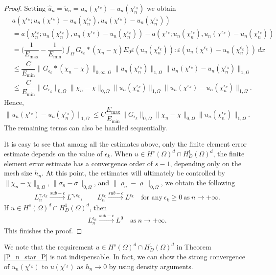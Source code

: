 \documentclass{amsart}
\begin{document}
\begin{proof}
Setting $\hat{u}_n=\tilde{u}_n=u_n(\chi^{\epsilon_k})-u_n(\chi_n^{\epsilon_k})$ we obtain
    \begin{align*}
        &a(\chi^{\epsilon_k};u_n(\chi^{\epsilon_k})-u_n(\chi_n^{\epsilon_k}),u_n(\chi^{\epsilon_k})-u_n(\chi_n^{\epsilon_k}))\\
         &= a(\chi_n^{\epsilon_k}; u_n(\chi_n^{\epsilon_k}), u_n(\chi^{\epsilon_k}) - u_n(\chi_n^{\epsilon_k})) - a(\chi^{\epsilon_k}; u_n(\chi_n^{\epsilon_k}), u_n(\chi^{\epsilon_k}) - u_n(\chi_n^{\epsilon_k})) \\
        &= \Big( \dfrac{1}{E_{\max}} - \dfrac{1}{E_{\min}} \Big) \int_\Omega G_{\epsilon_k} * (\chi_n - \chi) E_0 \varepsilon(u_n(\chi_n^{\epsilon_k})) : \varepsilon(u_n(\chi^{\epsilon_k}) - u_n(\chi_n^{\epsilon_k})) \, dx \\
        &\leq  \dfrac{C}{E_{\min}} \| G_{\epsilon_k} * (\chi_n - \chi) \|_{0,\infty,\Omega} \|u_n(\chi_n^{\epsilon_k})\|_{1,\Omega} \|u_n(\chi^{\epsilon_k}) - u_n(\chi_n^{\epsilon_k})\|_{1,\Omega} \\
        &\leq  \dfrac{C}{E_{\min}} \| G_{\epsilon_k} \|_{0,\Omega} \| \chi_n - \chi \|_{0,\Omega} \|u_n(\chi_n^{\epsilon_k})\|_{1,\Omega} \|u_n(\chi^{\epsilon_k}) - u_n(\chi_n^{\epsilon_k})\|_{1,\Omega}.
    \end{align*}
    Hence, 
    $$\|u_n(\chi^{\epsilon_k})-u_n(\chi_n^{\epsilon_k})\|_{1,\Omega}\leq C\dfrac{E_{\max}}{E_{\min}}\|G_{\epsilon_k}\|_{0,\Omega}\|\chi_n-\chi\|_{0,\Omega}\|u_n(\chi_n^{\epsilon_k})\|_{1,\Omega}.$$
    The remaining terms can also be handled sequentially.
    
    It is easy to see that among all the estimates above, only the finite element error estimate depends on the value of \(\epsilon_k\). When \(u \in H^s(\Omega)^d\cap H_D^1(\Omega)^d\), the finite element error estimate has a convergence order of \(s-1\), depending only on the mesh size \(h_n\). At this point, the estimates will ultimately be controlled by \(\|\chi_n - \chi\|_{0,\Omega}\), \(\|\sigma_n - \sigma\|_{0,\Omega}\), and \(\|\varrho_n - \varrho\|_{0,\Omega}\), we obtain the following
    \begin{eqnarray} 
    L_n^{\gamma,{\epsilon_k}}\stackrel{sub-c}{\longrightarrow} L^{\gamma,{\epsilon_k}}, \qquad L_n^{\epsilon_k}\stackrel{sub-c}{\longrightarrow} L^{\epsilon_k}\quad\mbox{for\ any}\ \epsilon_k\geq 0\ \mbox{as}\ n\rightarrow +\infty.\nonumber
    \end{eqnarray}
    If \(u \in H^s(\Omega)^d\cap H_D^1(\Omega)^d\), then
    \begin{eqnarray} 
    L_n^{\epsilon_n}\stackrel{sub-c}{\longrightarrow} L^{0}\quad\mbox{as}\  n\rightarrow +\infty.\nonumber
    \end{eqnarray}
    This finishes the proof.
\end{proof}
We note that the requirement \(u \in H^s(\Omega)^d\cap H_D^1(\Omega)^d\) in Theorem \ref{P_n_star_P} is not indispensable. In fact, we can show the strong convergence of $u_n(\chi^{\epsilon_k})$ to $u(\chi^{\epsilon_k})$ as $h_n\rightarrow 0$ by using density arguments. 
\end{document}
